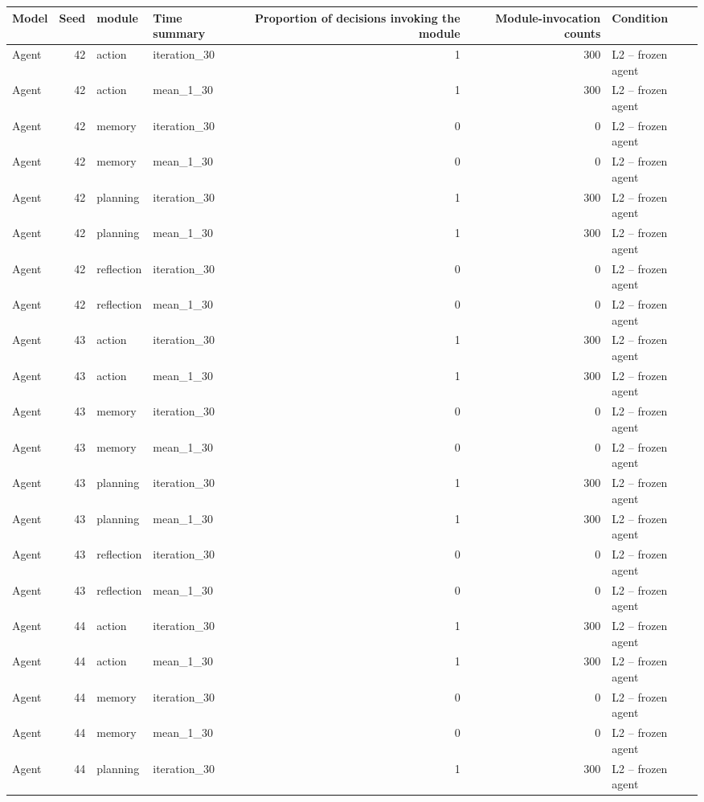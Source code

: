 \begin{table}[htbp!]
\centering
\small
\setlength{\tabcolsep}{3pt}
\renewcommand{\arraystretch}{1.1}
\begin{tabular}{lrllrrl}
\hline
Model & Seed & module & Time summary & Proportion of decisions invoking the module & Module-invocation counts & Condition \\
\hline
Agent & 42 & action & iteration\_30 & 1 & 300 & L2 -- frozen agent \\
Agent & 42 & action & mean\_1\_30 & 1 & 300 & L2 -- frozen agent \\
Agent & 42 & memory & iteration\_30 & 0 & 0 & L2 -- frozen agent \\
Agent & 42 & memory & mean\_1\_30 & 0 & 0 & L2 -- frozen agent \\
Agent & 42 & planning & iteration\_30 & 1 & 300 & L2 -- frozen agent \\
Agent & 42 & planning & mean\_1\_30 & 1 & 300 & L2 -- frozen agent \\
Agent & 42 & reflection & iteration\_30 & 0 & 0 & L2 -- frozen agent \\
Agent & 42 & reflection & mean\_1\_30 & 0 & 0 & L2 -- frozen agent \\
Agent & 43 & action & iteration\_30 & 1 & 300 & L2 -- frozen agent \\
Agent & 43 & action & mean\_1\_30 & 1 & 300 & L2 -- frozen agent \\
Agent & 43 & memory & iteration\_30 & 0 & 0 & L2 -- frozen agent \\
Agent & 43 & memory & mean\_1\_30 & 0 & 0 & L2 -- frozen agent \\
Agent & 43 & planning & iteration\_30 & 1 & 300 & L2 -- frozen agent \\
Agent & 43 & planning & mean\_1\_30 & 1 & 300 & L2 -- frozen agent \\
Agent & 43 & reflection & iteration\_30 & 0 & 0 & L2 -- frozen agent \\
Agent & 43 & reflection & mean\_1\_30 & 0 & 0 & L2 -- frozen agent \\
Agent & 44 & action & iteration\_30 & 1 & 300 & L2 -- frozen agent \\
Agent & 44 & action & mean\_1\_30 & 1 & 300 & L2 -- frozen agent \\
Agent & 44 & memory & iteration\_30 & 0 & 0 & L2 -- frozen agent \\
Agent & 44 & memory & mean\_1\_30 & 0 & 0 & L2 -- frozen agent \\
Agent & 44 & planning & iteration\_30 & 1 & 300 & L2 -- frozen agent \\

\end{tabular}
\end{table}
